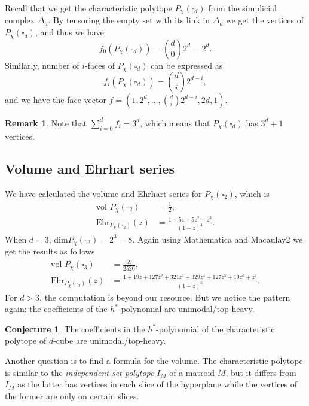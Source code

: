 \documentclass[12pt]{article}
\theoremstyle{definition}
\newtheorem{conj}[thm]{Conjecture}
\newtheorem{remark}[thm]{Remark}
\numberwithin{equation}{subsection}
\begin{document}
Recall that we get the characteristic polytope $P_{\chi}(\square_d)$ from the simplicial complex $\Delta_d$. By tensoring the empty set with its link in $\Delta_d$ we get the vertices of $P_{\chi}(\square_d)$, and thus we have 
\[
f_0(P_{\chi}(\square_d)) = \binom{d}{0} 2^d = 2^d.
\]
Similarly, number of $i$-faces of $P_{\chi}(\square_d)$ can be expressed as 
\[
f_i(P_{\chi}(\square_d)) = \binom{d}{i} 2^{d-i},
\]
and we have the face vector $f = (1, 2^d, \ldots, \binom{d}{i}2^{d-i}, 2d, 1)$.

\begin{remark}
    Note that $\sum_{i = 0}^{d} f_i = 3^d$, which means that $P_{\chi}(\square_d)$ has $3^d +1$ vertices.
\end{remark}

\subsection{Volume and Ehrhart series}
We have calculated the volume and Ehrhart series for $P_{\chi}(\square_2)$, which is
\begin{align*}
    \text{vol }P_{\chi}(\square_2) &= \frac{1}{2}, \\
    \text{Ehr}_{P_{\chi}(\square_2)}(z) &= \frac{1 + 5z + 5z^2 + z^3}{(1 - z)^4}.
\end{align*}
When $d = 3$, dim$P_{\chi}(\square_3) = 2^3 = 8$. Again using Mathematica and Macaulay2 we get the results as follows
\begin{align*}
    \text{vol }P_{\chi}(\square_3) &= \frac{59}{2520}, \\
    \text{Ehr}_{P_{\chi}(\square_3)}(z) &= \frac{1 + 19z + 127z^2 + 321z^3 + 329z^4 + 127z^5 + 19z^6 + z^7}{(1 - z)^8}.
\end{align*}
For $d > 3$, the computation is beyond our resource. But we notice the pattern again: the coefficients of the $h^*$-polynomial are unimodal/top-heavy. 
\begin{conj}
    The coefficients in the $h^*$-polynomial of the characteristic polytope of $d$-cube are unimodal/top-heavy.
\end{conj}

Another question is to find a formula for the volume. The characteristic polytope is similar to the \textit{independent set polytope} $I_M$ \citep{ABD10} of a matroid $M$, but it differs from $I_M$ as the latter has vertices in each slice of the hyperplane while the vertices of the former are only on certain slices.
\end{document}
